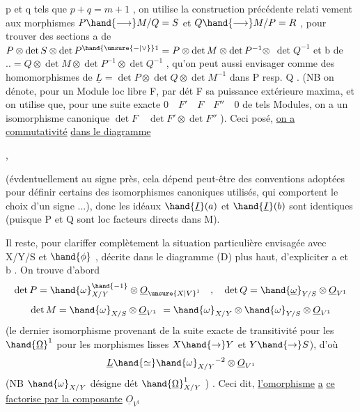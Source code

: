 
p et q tels que $p+q=m+1$ , on utilise la construction précédente relati
vement aux morphismes $P\hand{\longrightarrow} M/Q = S$ et $Q\hand{\longrightarrow} M/P = R$ , pour trouver
des sections  a de $P \otimes \det S \otimes \det P^{\hand{\unsure{-|\vee}}1} = P \otimes \det M \otimes \det P^{-1} \otimes$
$\det Q^{-1}$ et b de $.. = Q \otimes \det M \otimes \det P^{-1} \otimes \det Q^{-1}$ , qu'on peut
aussi envisager comme des homomorphismes de $\underline{L} = \det P \otimes \det Q \otimes \det M^{-1}$
dans P resp. Q . (NB on dénote, pour un Module loc libre F, par dét F
sa puissance extérieure maxima, et on utilise que, pour une suite
exacte $0 \quad F' \quad F \quad F'' \quad 0$ de tels Modules, on a un isomorphisme
canonique $\det F \quad \det F' \otimes \det F''$ ). Ceci posé, \uline{on a commutativité}
\uline{dans le diagramme}

,

(évdentuellement au signe près, cela dépend peut-être des conventions
adoptées pour définir certains des isomorphismes canoniques utilisés,
qui comportent le choix d'un signe ...), donc les idéaux $\hand{\underline{I}}(a)$ et $\hand{\underline{I}}(b)$
sont identiques (puisque P et Q sont loc facteurs directs dans M). 

Il reste, pour clariffer complètement la situation particulière
envisagée avec X/Y/S et $\hand{\phi}$ , décrite dans le diagramme (D) plus haut, 
d'expliciter a et b . On trouve d'abord
\[ \det P = \hand{\omega}_{X/Y}^{\hand{-1}} \otimes \underline{O}_{\unsure{X|V}^{1}} \quad , \quad \det Q = \hand{\underline{\omega}}_{Y/S} \otimes \underline{O}_{V^{1}} \]
\[ \det M = \hand{\omega}_{X/S} \otimes \underline{O}_{V^{1}} \ = \hand{\omega}_{X/Y} \otimes \hand{\omega}_{Y/S} \otimes \underline{O}_{V^{1}} \]
(le dernier isomorphisme provenant de la suite exacte de transitivité
pour les $\hand{\underline{\Omega}}^1$ pour les morphismes lisses $X\hand{\to}Y$ et $Y\hand{\to}S$), d'où
\[ \underline{L} \hand{\simeq} \hand{\omega}_{X/Y}{}^{-2} \otimes \underline{O}_{V^{1}} \]
(NB $\hand{\omega}_{X/Y}$ désigne  dét $\hand{\underline{\Omega}}^1_{X/Y}$ ) . Ceci dit, \uline{l'omorphisme} \uline{a} \uline{ce}
\uline{factorise par la composante} $\underline{O}_{V^{1}}$

